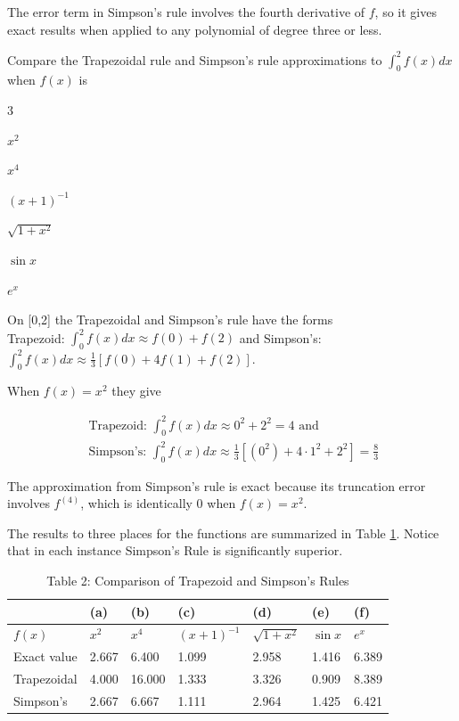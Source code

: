 The error term in Simpson's rule involves the fourth derivative of $f$, so it gives exact results when applied to any polynomial of degree three or less.

\begin{example}
Compare the Trapezoidal rule and Simpson's rule approximations to $\int_{0}^{2} f(x) d x$ when $f(x)$ is\\
\begin{enumerate}[label=(\alph*)]
\begin{multicols}{3}
\item $x^{2}$
\item $x^{4}$
\item $(x+1)^{-1}$
\item $\sqrt{1+x^{2}}$
\item $\sin x$
\item $e^{x}$
\end{multicols}
\end{enumerate}
\end{example}
\begin{mysolution}
On [0,2] the Trapezoidal and Simpson's rule have the forms\\
Trapezoid: $\int_{0}^{2} f(x) d x \approx f(0)+f(2)$ and Simpson's: $\int_{0}^{2} f(x) d x \approx \frac{1}{3}[f(0)+4 f(1)+f(2)]$.

When $f(x)=x^{2}$ they give

$$
\begin{gathered}
\text { Trapezoid: } \int_{0}^{2} f(x) d x \approx 0^{2}+2^{2}=4 \text { and } \\
\text { Simpson's: } \int_{0}^{2} f(x) d x \approx \frac{1}{3}\left[\left(0^{2}\right)+4 \cdot 1^{2}+2^{2}\right]=\frac{8}{3}
\end{gathered}
$$

The approximation from Simpson's rule is exact because its truncation error involves $f^{(4)}$, which is identically 0 when $f(x)=x^{2}$.

The results to three places for the functions are summarized in Table \ref{tab:simpsonexample1}. Notice that in each instance Simpson's Rule is significantly superior.
\end{mysolution}

\begin{table}[h]
\centering
\begin{tabular}{|l|l|l|l|l|l|l|}
\hline
 & (a) & (b) & (c) & (d) & (e) & (f) \\
\hline
$f(x)$ & $x^{2}$ & $x^{4}$ & $(x+1)^{-1}$ & $\sqrt{1+x^{2}}$ & $\sin x$ & $e^{x}$ \\
\hline
Exact value & 2.667 & 6.400 & 1.099 & 2.958 & 1.416 & 6.389 \\
\hline
Trapezoidal & 4.000 & 16.000 & 1.333 & 3.326 & 0.909 & 8.389 \\
\hline
Simpson's & 2.667 & 6.667 & 1.111 & 2.964 & 1.425 & 6.421 \\
\hline
\end{tabular}
\caption{\scriptsize Table 2: Comparison of Trapezoid and Simpson's Rules }
\label{tab:simpsonexample1}
\end{table}


